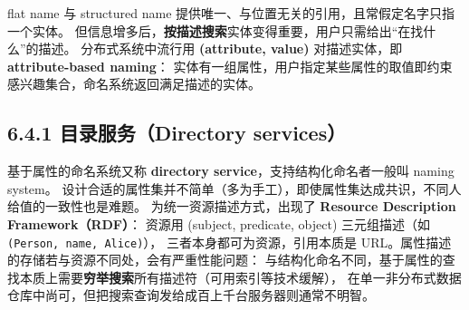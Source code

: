 \begin{closeread}
\end{closeread}



flat name 与 structured name 提供唯一、与位置无关的引用，且常假定名字只指一个实体。
但信息增多后，\textbf{按描述搜索}实体变得重要，用户只需给出“在找什么”的描述。
分布式系统中流行用 \textbf{(attribute, value)} 对描述实体，即 \textbf{attribute-based naming}：
实体有一组属性，用户指定某些属性的取值即约束感兴趣集合，命名系统返回满足描述的实体。

\subsection*{6.4.1 目录服务（Directory services）}
基于属性的命名系统又称 \textbf{directory service}，支持结构化命名者一般叫 naming system。
设计合适的属性集并不简单（多为手工），即使属性集达成共识，不同人给值的一致性也是难题。
为统一资源描述方式，出现了 \textbf{Resource Description Framework（RDF）}：
资源用 (subject, predicate, object) 三元组描述（如 \texttt{(Person, name, Alice)}），
三者本身都可为资源，引用本质是 URL。属性描述的存储若与资源不同处，会有严重性能问题：
与结构化命名不同，基于属性的查找本质上需要\textbf{穷举搜索}所有描述符（可用索引等技术缓解），
在单一非分布式数据仓库中尚可，但把搜索查询发给成百上千台服务器则通常不明智。

